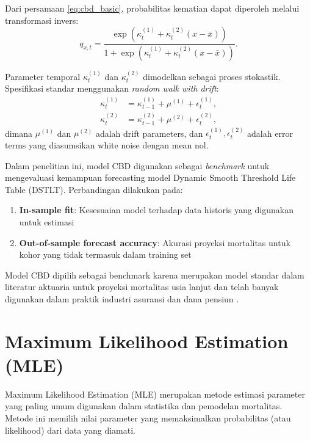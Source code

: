 Dari persamaan \eqref{eq:cbd_basic}, probabilitas kematian dapat diperoleh melalui transformasi invers:
\begin{equation}
q_{x,t} = \frac{\exp(\kappa_t^{(1)} + \kappa_t^{(2)} (x - \bar{x}))}{1 + \exp(\kappa_t^{(1)} + \kappa_t^{(2)} (x - \bar{x}))}.
\label{eq:cbd_qx}
\end{equation}

Parameter temporal $\kappa_t^{(1)}$ dan $\kappa_t^{(2)}$ dimodelkan sebagai proses stokastik. Spesifikasi standar menggunakan \textit{random walk with drift}:
\begin{align}
\kappa_t^{(1)} &= \kappa_{t-1}^{(1)} + \mu^{(1)} + \epsilon_t^{(1)}, \label{eq:cbd_rw1} \\
\kappa_t^{(2)} &= \kappa_{t-1}^{(2)} + \mu^{(2)} + \epsilon_t^{(2)}, \label{eq:cbd_rw2}
\end{align}
dimana $\mu^{(1)}$ dan $\mu^{(2)}$ adalah drift parameters, dan $\epsilon_t^{(1)}, \epsilon_t^{(2)}$ adalah error terms yang diasumsikan white noise dengan mean nol.



Dalam penelitian ini, model CBD digunakan sebagai \textit{benchmark} untuk mengevaluasi kemampuan forecasting model Dynamic Smooth Threshold Life Table (DSTLT). Perbandingan dilakukan pada:
\begin{enumerate}
    \item \textbf{In-sample fit}: Kesesuaian model terhadap data historis yang digunakan untuk estimasi
    \item \textbf{Out-of-sample forecast accuracy}: Akurasi proyeksi mortalitas untuk kohor yang tidak termasuk dalam training set
\end{enumerate}

Model CBD dipilih sebagai benchmark karena merupakan model standar dalam literatur aktuaria untuk proyeksi mortalitas usia lanjut dan telah banyak digunakan dalam praktik industri asuransi dan dana pensiun \citep{villegas2018comparative}.

\section{Maximum Likelihood Estimation (MLE)}

Maximum Likelihood Estimation (MLE) merupakan metode estimasi parameter yang paling umum digunakan dalam statistika dan pemodelan mortalitas. Metode ini memilih nilai parameter yang memaksimalkan probabilitas (atau likelihood) dari data yang diamati.

